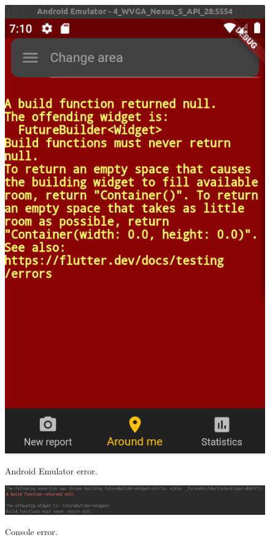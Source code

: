 \documentclass[../ATD.tex]{subfiles}
\begin{document}
    \begin{figure}[H]
        \centering
        \includegraphics[scale = 0.4]{assets/futureError.png}\\
        \caption[Android Emulator error]{Android Emulator error.}
    \end{figure}

    \begin{figure}[H]
        \centering
        \includegraphics[scale = 0.4]{assets/futureErrorConsole.png}\\
        \caption[Console error]{Console error.}
    \end{figure}
\end{document}
